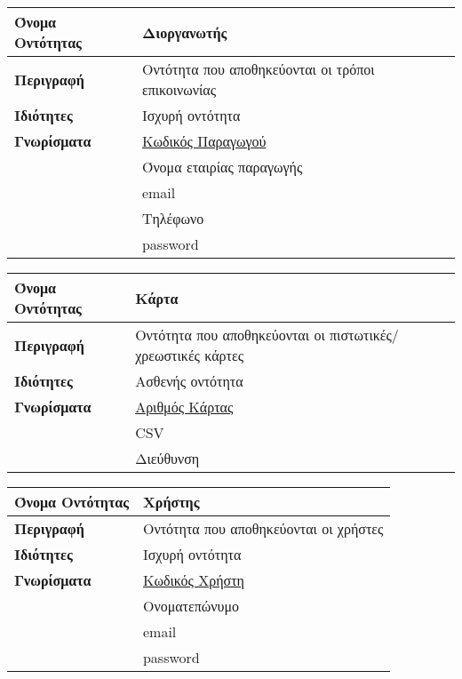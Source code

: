 \begin{center}
\begin{tabular}[]{|p{4cm}|p{10cm}|}
\hline
\textbf{Όνομα Οντότητας}   &  Διοργανωτής \\ \hline 
\textbf{Περιγραφή}         &  Οντότητα που αποθηκεύονται οι τρόποι επικοινωνίας \\ \hline 
\textbf{Ιδιότητες}         &  Ισχυρή οντότητα \\  \hline                 
\textbf{Γνωρίσματα}        &  \underline{Κωδικός Παραγωγού} \\
            ~              &  Όνομα εταιρίας παραγωγής \\
             ~             &  email \\
                           &  Τηλέφωνο \\
                           &  password \\
\hline
\end{tabular}
\vspace{0.3 cm}

\begin{tabular}[]{|p{4cm}|p{10cm}|}
\hline
\textbf{Όνομα Οντότητας}   &  Κάρτα \\ \hline 
\textbf{Περιγραφή}         &  Οντότητα που αποθηκεύονται οι πιστωτικές/χρεωστικές κάρτες \\ \hline 
\textbf{Ιδιότητες}         &  Ασθενής οντότητα \\  \hline                 
\textbf{Γνωρίσματα}        &  \underline{Αριθμός Κάρτας} \\
            ~              &  CSV \\
             ~             &  Διεύθυνση \\
\hline
\end{tabular}
\begin{tabular}[]{|p{4cm}|p{10cm}|}\\ \hline
\textbf{Όνομα Οντότητας}   &  Χρήστης\\ \hline 
\textbf{Περιγραφή}         &  Οντότητα που αποθηκεύονται οι χρήστες\\ \hline 
\textbf{Ιδιότητες}         &  Ισχυρή οντότητα \\  \hline                 
\textbf{Γνωρίσματα}        &  \underline{Κωδικός Χρήστη} \\
            ~              &  Ονοματεπώνυμο \\
                           &  email \\
                           &  password \\
\hline
\end{tabular}
\vspace{0.3 cm}

\end{center}
